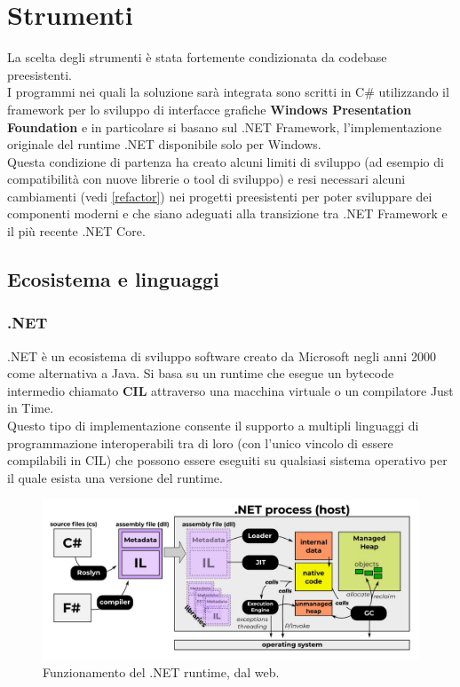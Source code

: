 \documentclass[\main/Tesi.tex]{subfiles}
\begin{document}
\chapter{Strumenti}

La scelta degli strumenti è stata fortemente condizionata da codebase preesistenti.\\
I programmi nei quali la soluzione sarà integrata sono scritti in C\# utilizzando il framework per lo sviluppo di interfacce grafiche \textbf{Windows Presentation Foundation} \cite{wpf} e in particolare si basano sul .NET Framework, l'implementazione originale del runtime .NET disponibile solo per Windows.\\
Questa condizione di partenza ha creato alcuni limiti di sviluppo (ad esempio di compatibilità con nuove librerie o tool di sviluppo) e resi necessari alcuni cambiamenti (vedi \ref{refactor}) nei progetti preesistenti per poter sviluppare dei componenti moderni e che siano adeguati alla transizione tra .NET Framework e il più recente .NET Core.

\section{Ecosistema e linguaggi}
\subsection{.NET}
.NET è un ecosistema di sviluppo software creato da Microsoft negli anni 2000 come alternativa a Java. Si basa su un runtime che esegue un bytecode intermedio chiamato \textbf{CIL} \cite{cil} attraverso una macchina virtuale o un compilatore Just in Time.\\
Questo tipo di implementazione consente il supporto a multipli linguaggi di programmazione interoperabili tra di loro (con l'unico vincolo di essere compilabili in CIL) che possono essere eseguiti su qualsiasi sistema operativo per il quale esista una versione del runtime.

\begin{figure}[h]
\caption{Funzionamento del .NET runtime, dal web.}
\includegraphics[width=\textwidth]{../images/dotnet.png}
\end{figure}
\end{document}

